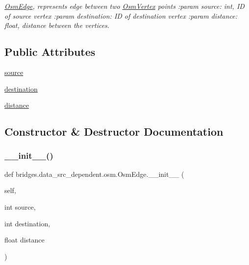 \begin{DoxyCompactItemize}
\begin{DoxyCompactList}\small\item\em \mbox{\hyperlink{classbridges_1_1data__src__dependent_1_1osm_1_1_osm_edge}{Osm\+Edge}}, represents edge between two \mbox{\hyperlink{classbridges_1_1data__src__dependent_1_1osm_1_1_osm_vertex}{Osm\+Vertex}} points \+:param source\+: int, ID of source vertex \+:param destination\+: ID of destination vertex \+:param distance\+: float, distance between the vertices. \end{DoxyCompactList}\end{DoxyCompactItemize}
\subsection*{Public Attributes}
\begin{DoxyCompactItemize}
\item 
\mbox{\hyperlink{classbridges_1_1data__src__dependent_1_1osm_1_1_osm_edge_a968664892933e9784909282cc53b0315}{source}}
\item 
\mbox{\hyperlink{classbridges_1_1data__src__dependent_1_1osm_1_1_osm_edge_aa81426d41bd031b2fa3789173206c0dc}{destination}}
\item 
\mbox{\hyperlink{classbridges_1_1data__src__dependent_1_1osm_1_1_osm_edge_aed843c7fcb887bb11b609387fc3af35f}{distance}}
\end{DoxyCompactItemize}


\subsection{Constructor \& Destructor Documentation}
\mbox{\label{classbridges_1_1data__src__dependent_1_1osm_1_1_osm_edge_aa3aa5332733e8eecc9074127837fc287}} 
\subsubsection{\texorpdfstring{\_\_init\_\_()}{\_\_init\_\_()}}
{\footnotesize\ttfamily def bridges.\+data\+\_\+src\+\_\+dependent.\+osm.\+Osm\+Edge.\+\_\+\+\_\+init\+\_\+\+\_\+ (\begin{DoxyParamCaption}\item[{}]{self,  }\item[{int}]{source,  }\item[{int}]{destination,  }\item[{float}]{distance }\end{DoxyParamCaption})}



